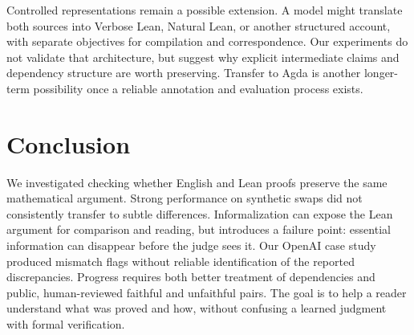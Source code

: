 \documentclass[sigconf,nonacm]{acmart}
\begin{document}
Controlled representations remain a possible extension. A model might translate both sources into Verbose Lean, Natural Lean, or another structured account, with separate objectives for compilation and correspondence. Our experiments do not validate that architecture, but suggest why explicit intermediate claims and dependency structure are worth preserving. Transfer to Agda is another longer-term possibility once a reliable annotation and evaluation process exists.

\section{Conclusion}
We investigated checking whether English and Lean proofs preserve the same mathematical argument. Strong performance on synthetic swaps did not consistently transfer to subtle differences. Informalization can expose the Lean argument for comparison and reading, but introduces a failure point: essential information can disappear before the judge sees it. Our OpenAI case study produced mismatch flags without reliable identification of the reported discrepancies. Progress requires both better treatment of dependencies and public, human-reviewed faithful and unfaithful pairs. The goal is to help a reader understand what was proved and how, without confusing a learned judgment with formal verification.



\end{document}
